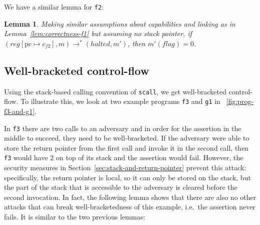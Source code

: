 \documentclass[compsoc,conference,letterpaper,fleqn]{IEEEtran}
\newtheorem{lemma}{Lemma}
\newcommand{\update}[2]{[#1 \mapsto #2]}
\newcommand{\var}[1]{\mathit{#1}}
\newcommand{\pcreg}{\mathrm{pc}}
\newcommand{\reg}{\var{reg}}
\newcommand{\flag}{\var{flag}}
\newcommand{\halted}{\mathit{halted}}
\newcommand{\step}[1][]{\rightarrow_{#1}}
\begin{document}
We have a similar lemma for \texttt{\footnotesize{f2}}:
\begin{lemma}
  \label{lem:correctness-f2}
  Making similar assumptions about capabilities and linking as in
  Lemma~\ref{lem:correctness-f1} but assuming no stack pointer,
  if $(\reg\update{\pcreg}{c_{f2}},m) \step^* (\halted,m')$, then $m'(\flag) = 0$.
\end{lemma}

\subsection{Well-bracketed control-flow} 
Using the stack-based calling convention of \texttt{\footnotesize{scall}}, we get
well-bracketed control-flow. To illustrate this, we look at
two example programs \texttt{\footnotesize{f3}} and
\texttt{\footnotesize{g1}} in \figurename~\ref{fig:prog-f3-and-g1}.

In \texttt{\footnotesize{f3}} there are two calls to an adversary and in order
for the assertion in the middle to succeed, they need to be well-bracketed. If
the adversary were able to store the return pointer from the first call and
invoke it in the second call, then \texttt{\footnotesize{f3}} would have $2$ on
top of its stack and the assertion would fail. However, the security measures in
Section~\ref{sec:stack-and-return-pointer} prevent this attack: specifically,
the return pointer is local, so it can only be stored on the stack, but the part
of the stack that is accessible to the adversary is cleared before the second
invocation. In fact, the following lemma shows that there are also no other
attacks that can break well-bracketedness of this example, i.e.\ the assertion
never fails. It is similar to the two previous lemmas:
\end{document}
